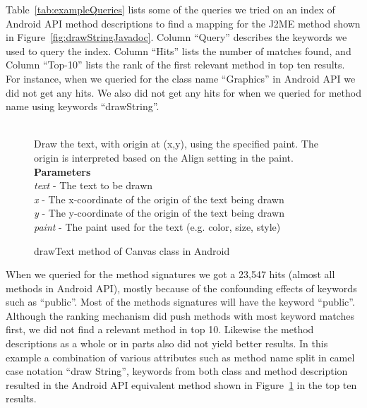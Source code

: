 Table~\ref{tab:exampleQueries} lists some of the queries we tried on an index of Android API method descriptions to find a mapping for the J2ME method  shown in Figure~\ref{fig:drawStringJavadoc}. 
Column ``Query'' describes the keywords we used to query the index. Column ``Hits'' lists the number of matches found, and Column ``Top-10'' lists the rank of the first relevant method in top ten results. For instance, when we queried for the class name ``Graphics'' in Android API we did not get any hits. We also did not get any hits for when we queried for method name using keywords ``drawString''. 

\begin{figure}
	\begin{framed}
		\begin{small}
			\\
			Draw the text, with origin at (x,y), using the specified paint. The origin is interpreted based on the Align setting in the paint.\\
			\textbf{Parameters}\\
			\textit{text} - The text to be drawn\\
			\textit{x} - The x-coordinate of the origin of the text being drawn\\
			\textit{y} - The y-coordinate of the origin of the text being drawn\\
			\textit{paint} - The paint used for the text (e.g. color, size, style)
		\end{small}
	\end{framed}
	\caption{drawText method of Canvas class in Android}
	\label{fig:drawTextJavadoc}
\end{figure}

When we queried for the method signatures we got a 23,547 hits (almost all methods in Android API), mostly because of the confounding effects of keywords such as ``public''. Most of the methods signatures will have the keyword ``public''. 
Although the ranking mechanism did push methods with most keyword matches first, we did not find a relevant method in top 10.
Likewise the method descriptions as a whole or in parts also did not yield better results.
In this example a combination of various attributes such as method name split in camel case notation ``draw String'', keywords from both class and method description resulted in the Android API equivalent method  shown in Figure~\ref{fig:drawTextJavadoc} in the top ten results.

